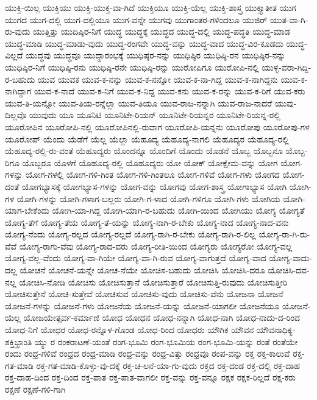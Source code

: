 {ಯುಕ್ತಿ-ಯಿಲ್ಲ
ಯುಕ್ತಿಯು
ಯುಕ್ತಿ-ಯುಕ್ತ-ವಾ-ಗಿದೆ
ಯುಕ್ತಿಯೂ
ಯುಕ್ತಿ-ಯೆಲ್ಲ
ಯುಕ್ತಿ-ಶಾಸ್ತ್ರ
ಯುಕ್ತ್ಯಾತೀತ
ಯುಗ
ಯುಗದ
ಯುಗ-ದಲ್ಲಿ
ಯುಗ-ದಲ್ಲಿಯೂ
ಯುಗ-ವನ್ನೇ
ಯುಗವು
ಯುಗಾಂತರ-ಗಳಿಂದಲೂ
ಯುಜಿರ್
ಯುತ-ವಾ-ಗಿ-ರು-ವುದು
ಯುತ್ತಿತ್ತು
ಯುದಿಷ್ಠಿರ-ನಿಗೆ
ಯುದ್ಧ
ಯುದ್ಧಕ್ಕೆ
ಯುದ್ಧದ
ಯುದ್ಧ-ದಲ್ಲಿ
ಯುದ್ಧ-ಪದ್ಧತಿ
ಯುದ್ಧ-ಮಾಡ
ಯುದ್ಧ-ಮಾಡಿ
ಯುದ್ಧ-ಮಾಡು-ವುದು
ಯುದ್ಧ-ರಂಗವೇ
ಯುದ್ಧ-ವನ್ನು
ಯುದ್ಧ-ವಾದ
ಯುದ್ಧ-ವಿರ-ಕೂಡದು
ಯುದ್ಧ-ವಿಲ್ಲದೆ
ಯುದ್ಧವು
ಯುದ್ಧವೂ
ಯುದ್ಧಾರಂಭಕ್ಕೆ
ಯುಧಿಷ್ಠರ-ನನ್ನು
ಯುಧಿಷ್ಠಿರ
ಯುಧಿಷ್ಠಿ-ರನ
ಯುಧಿಷ್ಠಿರ-ನನ್ನು
ಯುಧಿಷ್ಠಿರ-ನಿಗೆ
ಯುಧಿಷ್ಠಿ-ರನು
ಯುಧಿಷ್ಠಿ-ರನೇ
ಯುಧಿಷ್ಠಿ-ರನ್ನು
ಯುರೋಪಿಗೂ
ಯುರೋಪಿ-ನಲ್ಲಿ
ಯುಳ್ಳ-ವರಾ-ಗಿದ್ದಿ-ರ-ಬಹುದು
ಯುವ
ಯುವಕ
ಯುವ-ಕ-ನನ್ನು
ಯುವ-ಕ-ನನ್ನೋ
ಯುವ-ಕ-ನಾ-ಗಿದ್ದ
ಯುವ-ಕ-ನಾಗಿದ್ದನು
ಯುವ-ಕ-ನಾಗಿದ್ದಾಗ
ಯುವ-ಕ-ನಾದೆ
ಯುವ-ಕ-ನಿಗೆ
ಯುವ-ಕ-ನಿದ್ದ
ಯುವ-ಕನು
ಯುವ-ಕ-ರನ್ನು
ಯುವ-ಕ-ರಿಗೆ
ಯುವ-ಕರು
ಯುವ-ತಿ-ಯನ್ನೋ
ಯುವ-ತಿಯ-ರನ್ನೆಲ್ಲಾ
ಯುವ-ತಿಯೂ
ಯುವ-ರಾಜ-ನನ್ನಾಗಿ
ಯುವ-ರಾಜ-ನಾದರೆ
ಯುವು-ದಿಲ್ಲವೊ
ಯುವುದು
ಯೂ
ಯೂನಿಟಿ
ಯೂನಿಟೇ-ರಿಯನ್
ಯೂನಿಟೇ-ರಿಯನ್ನರ
ಯೂನಿಟೇ-ರಿಯನ್ನ-ರಲ್ಲಿ
ಯೂರೋಪಿನ
ಯೂರೋಪಿ-ನಲ್ಲಿ
ಯೂರೋಪಿನಲ್ಲಿ-ರುವಾಗ
ಯೂರೋಪಿ-ಯನ್ನನು
ಯೂರೋಪು
ಯೂರೋಪು-ಗಳ
ಯೂರೋಪ್
ಯೆಂದು
ಯೆಡೆಗೆ
ಯೆಲ್ಲ
ಯೆಲ್ಲಾ
ಯೆಹೂದ್ಯ
ಯೆಹೂದ್ಯ-ನಾಗಲಿ
ಯೆಹೂದ್ಯರ
ಯೆಹೂದ್ಯ-ರಲ್ಲಿ
ಯೆಹೂದ್ಯ-ರಲ್ಲಿ-ರು-ವಂತೆ
ಯೆಹೂದ್ಯರು
ಯೊಂದನ್ನೂ
ಯೊಂದಿಗೆ
ಯೊಂದು
ಯೊಡನೆ
ಯೊಬ್ಬ
ಯೊಬ್ಬನೂ
ಯೊಬ್ಬ-ರಿಗೂ
ಯೊಬ್ಬರೂ
ಯೊಳಗೆ
ಯೊಹೂದ್ಯ-ರಲ್ಲಿ
ಯೊಹೂದ್ಯರು
ಯೋ
ಯೋಕ್
ಯೋಕ್ಷೇಮ-ವನ್ನು
ಯೋಗ
ಯೋಗ-ಗಳನ್ನು
ಯೋಗ-ಗಳಲ್ಲಿ
ಯೋಗ-ಗಳಿ-ಗಿಂತ
ಯೋಗ-ಗಳಿ-ಗಿಂತಲೂ
ಯೋಗ-ಗಳಿವೆ
ಯೋಗ-ಗಳು
ಯೋಗದ
ಯೋಗ-ದಂತೆ
ಯೋಗಭ್ಯಾಸಕ್ಕೆ
ಯೋಗಭ್ಯಾಸ-ಗಳನ್ನು
ಯೋಗ-ವನ್ನು
ಯೋಗವು
ಯೋಗ-ಶಾಸ್ತ್ರ
ಯೋಗಾಭ್ಯಾಸ
ಯೋಗಿ
ಯೋಗಿ-ಗಳ
ಯೋಗಿ-ಗಳನ್ನು
ಯೋಗಿ-ಗಳಾಗ-ಬಲ್ಲರು
ಯೋಗಿ-ಗ-ಳಾದ
ಯೋಗಿ-ಗಳಿಗೂ
ಯೋಗಿ-ಗಳು
ಯೋಗಿಯ
ಯೋಗಿ-ಯಾಗ-ಬೇಕೆಂದು
ಯೋಗಿ-ಯಾ-ಗಿದ್ದ
ಯೋಗಿ-ಯಾಗಿ-ರ-ಬಹುದು
ಯೋಗಿ-ಯಿಂದ
ಯೋಗಿಯು
ಯೋಗ್ಯ
ಯೋಗ್ಯತೆ
ಯೋಗ್ಯ-ತೆಗೆ
ಯೋಗ್ಯ-ತೆಯ
ಯೋಗ್ಯ-ತೆ-ಯನ್ನು
ಯೋಗ್ಯ-ನಾಗಿ-ರ-ಬೇಕು
ಯೋಗ್ಯ-ನಾದ
ಯೋಗ್ಯ-ನಾದ-ವನು
ಯೋಗ್ಯ-ನೆಂದು
ಯೋಗ್ಯ-ರಲ್ಲದ
ಯೋಗ್ಯ-ರಲ್ಲದೆ
ಯೋಗ್ಯ-ರಾಗಿ-ರ-ಬೇಕು
ಯೋಗ್ಯ-ರಾಗಿ-ರ-ಲಿಲ್ಲ
ಯೋಗ್ಯ-ರಾ-ಗಿ-ರು-ವೆವೆ
ಯೋಗ್ಯ-ರಾಗು-ವೆವು
ಯೋಗ್ಯ-ರಾದ-ವರು
ಯೋಗ್ಯ-ರೀತಿ-ಯಿಂದ
ಯೋಗ್ಯರು
ಯೋಗ್ಯರೋ
ಯೋಗ್ಯ-ವಲ್ಲ
ಯೋಗ್ಯ-ವಲ್ಲ-ವೆಂದು
ಯೋಗ್ಯ-ವಾ-ಗಿಯೇ
ಯೋಗ್ಯ-ವಾ-ಗಿ-ರುವ
ಯೋಗ್ಯ-ವಾಗುತ್ತದೆ
ಯೋಗ್ಯ-ವಾದ
ಯೋಗ್ಯ-ವಾದು-ದಲ್ಲ
ಯೋಚನೆ
ಯೋಚನೆ-ಯನ್ನೇ
ಯೋಚ-ನೆಯೇ
ಯೋಚಿಸ-ಬಹುದು
ಯೋಚಿಸಿ
ಯೋಚಿಸಿ-ದರೂ
ಯೋಚಿಸಿ-ದವ-ನಲ್ಲ
ಯೋಚಿಸಿ-ನೋಡಿ
ಯೋಚಿಸು
ಯೋಚಿಸುತ್ತಾನೆ
ಯೋಚಿಸುತ್ತಾರೆ
ಯೋಚಿಸುತ್ತಿ-ರುವುದು
ಯೋಚಿಸುತ್ತೀರಿ
ಯೋಚಿಸುತ್ತೇನೆ
ಯೋಚಿ-ಸುತ್ತೇವೆ
ಯೋಚಿಸುವ
ಯೋಚಿಸು-ವುದು
ಯೋಚಿಸು-ವೆನು
ಯೋಜನಾ
ಯೋಜನೆ
ಯೋಜನೆ-ಗಳನ್ನು
ಯೋಜನೆ-ಗಳು
ಯೋಜನೆಯ
ಯೋಜನೆ-ಯನ್ನು
ಯೋಜನೆ-ಯಾಗಲೀ
ಯೋಜನೆಯೂ
ಯೋಜನೆ-ಯೆಲ್ಲ
ಯೋಜಯೇತ್ಸರ್ವ-ಕರ್ಮಾಣಿ
ಯೋಧ
ಯೋಧನ
ಯೋಧ-ನನ್ನಾಗಿ
ಯೋಧ-ನಾಗಿ
ಯೋಧ-ನಾದು-ದ-ರಿಂದ
ಯೋಧ-ನಿಗೆ
ಯೋಧರ
ಯೋಧ-ರನ್ನೊಳ-ಗೊಂಡ
ಯೋಧ-ರಿಂದ
ಯೋಧರು
ಯೌಗಿಕ
ಯೌವನ
ಯೌವನಾಧಿಕ್ಯ-ಶಕ್ತಿಭ್ರಾಂತಿ
ಯ್ಯು
ರ
ರಂಕರಾಟಣೆ-ಯಂತೆ
ರಂಗ-ಭೂಮಿ
ರಂಗ-ಭೂಮಿಯ
ರಂಗ-ಭೂಮಿ-ಯನ್ನು
ರಂತೆ
ರಂತೆಯೇ
ರಂದು
ರಂಧ್ರ-ಗಳಿವೆ
ರಂಧ್ರದ
ರಂಧ್ರ-ಮಾಡಿ
ರಂಧ್ರ-ವನ್ನು
ರಂಧ್ರ-ವಿತ್ತು
ರಂಧ್ರವೂ
ರಂಪ-ವನ್ನು
ರಕ್ತ
ರಕ್ತ-ಕಾಲುವೆ
ರಕ್ತ-ಗತ-ಮಾಡಿ
ರಕ್ತ-ಗತ-ಮಾಡಿ-ಕೊಳ್ಳು-ವು-ದಕ್ಕೆ
ರಕ್ತ-ಚ-ಲನೆ-ಯಾ-ಗು-ವುದು
ರಕ್ತದ
ರಕ್ತ-ದಂಡ
ರಕ್ತ-ದಲ್ಲಿ
ರಕ್ತ-ದಾಹ
ರಕ್ತ-ದಾಹ-ದಿಂದ
ರಕ್ತ-ದಿಂದ
ರಕ್ತ-ಪಾತ
ರಕ್ತ-ಪಾತ-ವಾಗಲೀ
ರಕ್ತ-ವನ್ನು
ರಕ್ತ-ವನ್ನೂ
ರಕ್ಷಕ
ರಕ್ಷಕ-ರಿಲ್ಲದೆ
ರಕ್ಷ-ಕರು
ರಕ್ಷಣೆ
ರಕ್ಷಣೆ-ಗಳಿ-ಗಾಗಿ
}

